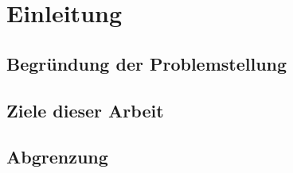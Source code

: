 \section{Einleitung} %
\label{sec:einleitung}

\subsection{Begründung der Problemstellung} %
\label{sub:begrundung_der_problemstellung}


\subsection{Ziele dieser Arbeit} %
\label{sub:ziele_dieser_arbeit}


\subsection{Abgrenzung} %
\label{sub:abgrenzung}



